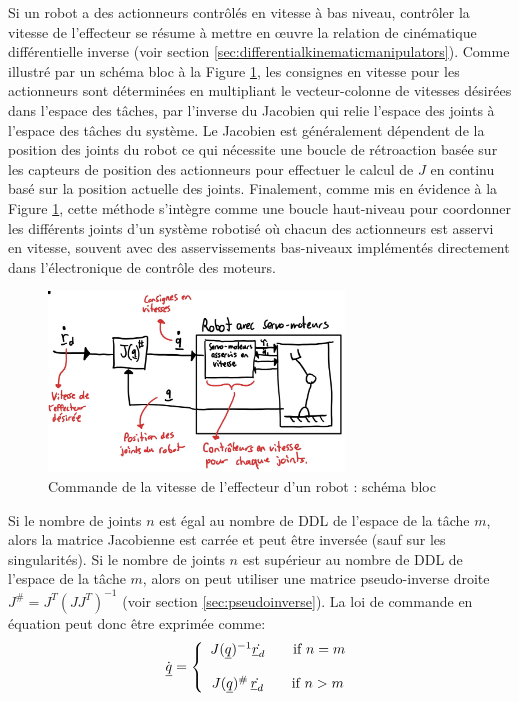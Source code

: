 Si un robot a des actionneurs contrôlés en vitesse à bas niveau, contrôler la vitesse de l'effecteur se résume à mettre en œuvre la relation de cinématique différentielle inverse (voir section \ref{sec:differentialkinematicmanipulators}).  Comme illustré par un schéma bloc à la Figure \ref{fig:robotspeedcontrol}, les consignes en vitesse pour les actionneurs sont déterminées en multipliant le vecteur-colonne de vitesses désirées dans l'espace des tâches, par l'inverse du Jacobien qui relie l'espace des joints à l'espace des tâches du système. Le Jacobien est généralement dépendent de la position des joints du robot ce qui nécessite une boucle de rétroaction basée sur les capteurs de position des actionneurs pour effectuer le calcul de $J$ en continu basé sur la position actuelle des joints. Finalement, comme mis en évidence à la Figure \ref{fig:robotspeedcontrol}, cette méthode s'intègre comme une boucle haut-niveau pour coordonner les différents joints d'un système robotisé où chacun des actionneurs est asservi en vitesse, souvent avec des asservissements bas-niveaux implémentés directement dans l'électronique de contrôle des moteurs.
\begin{figure}[H]
	\centering
	\includegraphics[width=0.7\textwidth]{fig/robotspeedcontrol.jpg}
	\caption{Commande de la vitesse de l'effecteur d'un robot : schéma bloc}
	\label{fig:robotspeedcontrol}
\end{figure}

Si le nombre de joints $n$ est égal au nombre de DDL de l'espace de la tâche $m$, alors la matrice Jacobienne est carrée et peut être inversée (sauf sur les singularités). Si le nombre de joints $n$ est supérieur au nombre de DDL de l'espace de la tâche $m$, alors on peut utiliser une matrice pseudo-inverse droite $J^{\#} = J^T (J J^T)^{-1}$ (voir section \ref{sec:pseudoinverse}). La loi de commande en équation peut donc être exprimée comme:
\begin{align}
	\dot{\underline{q}} = \left\{ \begin{array}{c}
								J(\underline{q})^{-1} \dot{\underline{r}_d}   \quad\quad \text{if $n=m$}
								\\ \\
								J(\underline{q})^{\#} \, \dot{\underline{r}_d}   \quad\quad \text{if $n>m$}
	\end{array}
	\right.
\end{align}

